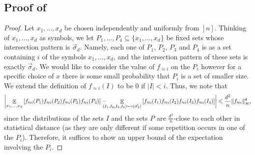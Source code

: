 \documentclass{toc}
\newcommand\card[1]{\left| {#1} \right|}
\newcommand\Expect[2]{{\mathop{\mathbb{E}}_{#1}\left[ {#2} \right]}}
\newcommand\norm[1]{\| #1 \|}
\renewcommand\leq{\leqslant}
\newcommand\approxlvlfn[2]{{#1}_{\approx{#2}}}
\begin{document}
\subsection{Proof of }    %
\begin{proof}
Let $x_1,...,x_d$ be chosen independently and uniformly from $[n]$.
Thinking of $x_1,\ldots,x_d$ as symbols, we let $P_1,...,P_4\subseteq \{x_1,\ldots,x_d\}$ be
fixed %
sets %
%
%
whose intersection pattern is $\vec{\sigma}_d$.
Namely, each one of $P_1$, $P_2$, $P_3$ and $P_4$ is
%
%
as a set containing $i$ of the symbols %
%
$x_1,\ldots,x_d$, and the intersection pattern of these sets is
exactly $\vec{\sigma}_d$.
We would like to consider the value of $\approxlvlfn{f}{i}$
on the %
$P_i$   %
however for a specific choice of $x$ there is some small probability that $P_i$ is a set of smaller
size. We extend the definition of $\approxlvlfn{f}{i}(I)$ to be $0$ if $\card{I} < i$.
Thus, we note that
\[
\card{
\Expect{x_1,...,x_d}{
\approxlvlfn{f}{i}(P_1)\approxlvlfn{f}{i}(P_2)\approxlvlfn{f}{i}(P_3)\approxlvlfn{f}{i}(P_4)}
-\hspace{-2ex}
\Expect{(I_1,I_2,I_3,I_4) \sim \gamma(\vec{\sigma_d})}{
\approxlvlfn{f}{i}(I_1)\approxlvlfn{f}{i}(I_2)\approxlvlfn{f}{i}(I_3)\approxlvlfn{f}{i}(I_4)
}}
\leq \frac{d^2}{n}\norm{\approxlvlfn{f}{i}}^4_{\infty},
\]
since the distributions of the %
sets $I$ and the sets $P$   %
are $\frac{d^2}{n}$-close  %
to each other in statistical distance
(as they are only different if some repetition occurs in
one of the %
$P_i$).   %
Therefore, it suffices to show an upper bound of the expectation involving
the %
$P_i$.   %


\end{proof}
\end{document}
